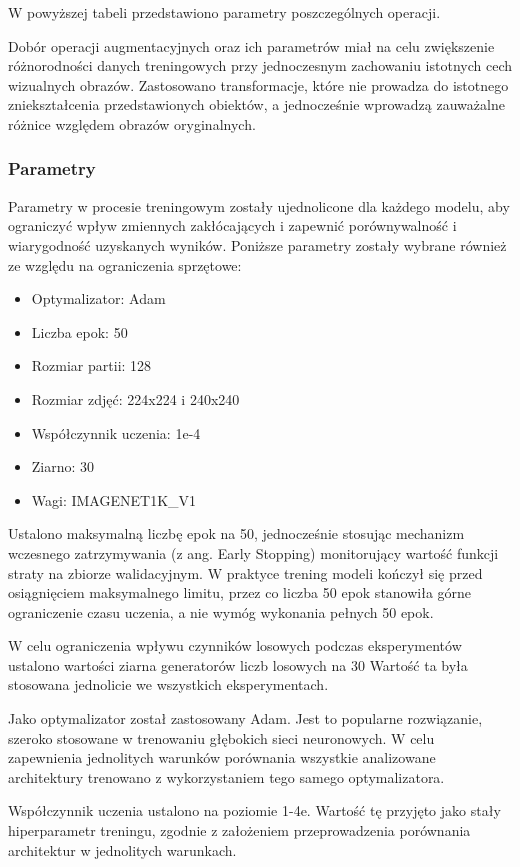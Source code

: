 W powyższej tabeli przedstawiono parametry poszczególnych operacji.

Dobór operacji augmentacyjnych oraz ich parametrów miał na celu zwiększenie różnorodności danych treningowych przy jednoczesnym zachowaniu istotnych cech wizualnych obrazów. Zastosowano transformacje, które nie prowadza do istotnego zniekształcenia przedstawionych obiektów, a jednocześnie wprowadzą zauważalne różnice względem obrazów oryginalnych.  
\subsubsection{Parametry}
Parametry w procesie treningowym zostały ujednolicone dla każdego modelu, aby ograniczyć wpływ zmiennych zakłócających i zapewnić porównywalność i wiarygodność uzyskanych wyników. Poniższe parametry zostały wybrane również ze względu na ograniczenia sprzętowe:
\begin{itemize}
	\item Optymalizator: Adam
	\item Liczba epok: 50
	\item Rozmiar partii: 128
	\item Rozmiar zdjęć: 224x224 i 240x240
	\item Współczynnik uczenia: 1e-4
	\item Ziarno: 30
	\item Wagi: IMAGENET1K\_V1
\end{itemize}

Ustalono maksymalną liczbę epok na 50, jednocześnie stosując mechanizm wczesnego zatrzymywania (z ang. Early Stopping) monitorujący wartość funkcji straty na zbiorze walidacyjnym. W praktyce trening modeli kończył się przed osiągnięciem maksymalnego limitu, przez co liczba 50 epok stanowiła górne ograniczenie czasu uczenia, a nie wymóg wykonania pełnych 50 epok.

W celu ograniczenia wpływu czynników losowych podczas eksperymentów ustalono wartości ziarna generatorów liczb losowych na 30 Wartość ta była stosowana jednolicie we wszystkich eksperymentach.

Jako optymalizator został zastosowany Adam. Jest to popularne rozwiązanie, szeroko stosowane w trenowaniu głębokich sieci neuronowych. W celu zapewnienia jednolitych warunków porównania wszystkie analizowane architektury trenowano z wykorzystaniem tego samego optymalizatora. 

Współczynnik uczenia ustalono na poziomie 1-4e. Wartość tę przyjęto jako stały hiperparametr treningu, zgodnie z założeniem przeprowadzenia porównania architektur w jednolitych warunkach.

